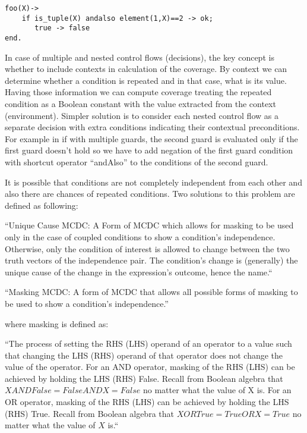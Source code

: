 \documentclass[12pt,a4paper]{report}
\begin{document}
\begin{lstlisting}
foo(X)->
    if is_tuple(X) andalso element(1,X)==2 -> ok;
       true -> false
end.
\end{lstlisting} 

In case of multiple and nested control flows (decisions), the key concept is whether to include contexts in calculation of the coverage. By context we can
 determine whether a condition is repeated and in that case, what is its value. Having those information we can compute coverage treating the repeated
 condition as a Boolean constant with the value extracted from the context (environment). Simpler solution is to consider each nested control flow as a
 separate decision with extra conditions indicating their contextual preconditions. For example in if with multiple guards, the second guard is evaluated
 only if the first guard doesn’t hold so we have to add negation of the first guard condition with shortcut operator “andAlso” to the conditions of the
 second guard.

It is possible that conditions are not completely independent from each other and also there are chances of repeated conditions. Two solutions to this
 problem are defined as following:

“Unique Cause MCDC: A Form of MCDC which allows for masking to be used only in the case of coupled conditions to show a condition’s independence.
 Otherwise, only the condition of interest is allowed to change between the two truth vectors of the independence pair. The condition’s change is
 (generally) the unique cause of the change in the expression’s outcome, hence the name.“\cite{chilenski2001investigation}

“Masking MCDC: A form of MCDC that allows all possible forms of masking to be used to show a condition’s independence.”\cite{chilenski2001investigation}

where masking is defined as:

“The process of setting the RHS (LHS) operand of an operator to a value such that changing the LHS (RHS) operand of that operator does not change the
 value of the operator. For an AND operator, masking of the RHS (LHS) can be achieved by holding the LHS (RHS) False.  Recall from Boolean algebra that
 $X AND False = False AND X = False$ no matter what the value of X is. For an OR operator, masking of the RHS (LHS) can be achieved by holding the LHS
 (RHS) True. Recall from Boolean algebra that $X OR True = True OR X = True$ no matter what the value of $X$ is.“\cite{chilenski2001investigation}
\end{document}
